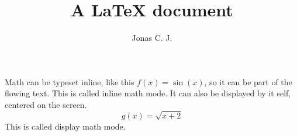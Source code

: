 \documentclass[a4paper, 12pt]{article}
\title{A \LaTeX{} document}
\author{Jonas C. J.}
\begin{document}
\maketitle
Math can be typeset inline, like this $f(x) = \sin(x)$, so it can be part of the flowing text. This is called inline math mode. It can also be displayed by it self, centered on the screen.
\begin{equation}
	g(x) = \sqrt{x+2}
\end{equation}
This is called display math mode.
\end{document}

